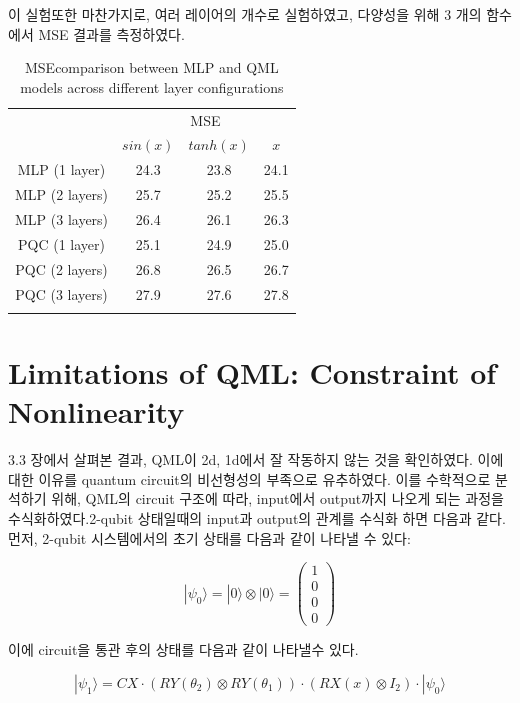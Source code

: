 이 실험또한 마찬가지로, 여러 레이어의 개수로 실험하였고, 다양성을 위해 3 개의 함수에서 MSE  결과를 측정하였다.

\begin{table}[ht]
    \centering
    \begin{tabular}{c|ccc}
    \Xhline{3\arrayrulewidth}
    \multirow{2}{*}{Layers} & \multicolumn{3}{c}{MSE} \\
    \cline{2-4}
    & $sin(x)$  & $tanh(x)$ & $x$ \\
    \hline
    MLP (1 layer) & 24.3 & 23.8 & 24.1 \\
    MLP (2 layers) & 25.7 & 25.2 & 25.5 \\
    MLP (3 layers) & 26.4 & 26.1 & 26.3 \\
    \hline
    PQC (1 layer) & 25.1 & 24.9 & 25.0 \\
    PQC (2 layers) & 26.8 & 26.5 & 26.7 \\
    PQC (3 layers) & 27.9 & 27.6 & 27.8 \\
    \Xhline{3\arrayrulewidth}
    \end{tabular}
    \caption{MSEcomparison between MLP and QML models across different layer configurations}
    \label{tab:mse_comparison}
\end{table}




\section{Limitations of QML: Constraint of Nonlinearity}

3.3 장에서 살펴본 결과, QML이 2d, 1d에서 잘 작동하지 않는 것을 확인하였다. 이에 대한 이유를 quantum circuit의 비선형성의 부족으로 유추하였다. 이를 수학적으로 분석하기 위해, QML의 circuit 구조에 따라, input에서 output까지 나오게 되는 과정을 수식화하였다.2-qubit 상태일때의 input과 output의 관계를 수식화 하면 다음과 같다.
먼저, 2-qubit 시스템에서의 초기 상태를 다음과 같이 나타낼 수 있다:

\[
|\psi_0\rangle = |0\rangle \otimes |0\rangle = \begin{pmatrix} 1 \\ 0 \\ 0 \\ 0 \end{pmatrix}
\]

이에  circuit을 통관 후의 상태를 다음과 같이 나타낼수 있다.

\[
|\psi_1\rangle = CX \cdot (RY(\theta_2) \otimes RY(\theta_1)) \cdot (RX(x) \otimes I_2) \cdot |\psi_0\rangle
\]

